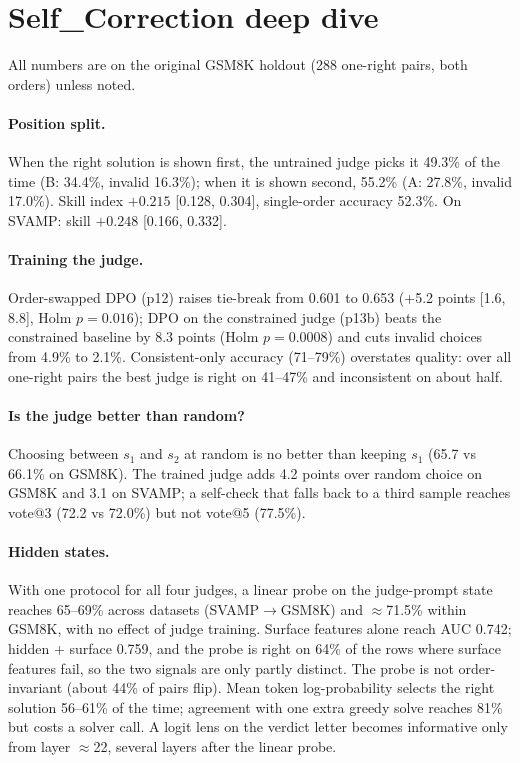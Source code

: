 \documentclass[11pt]{article}
\begin{document}
\section{Self\_Correction deep dive}\label{app:sc}
All numbers are on the original GSM8K holdout (288 one-right pairs, both orders) unless noted.
\paragraph{Position split.} When the right solution is shown first, the untrained judge picks it 49.3\% of the
time (B: 34.4\%, invalid 16.3\%); when it is shown second, 55.2\% (A: 27.8\%, invalid 17.0\%). Skill index
$+0.215$ [0.128, 0.304], single-order accuracy 52.3\%. On SVAMP: skill $+0.248$ [0.166, 0.332].
\paragraph{Training the judge.} Order-swapped DPO (p12) raises tie-break from 0.601 to 0.653 (+5.2 points
[1.6, 8.8], Holm $p=0.016$); DPO on the constrained judge (p13b) beats the constrained baseline by 8.3 points
(Holm $p=0.0008$) and cuts invalid choices from 4.9\% to 2.1\%. Consistent-only accuracy (71--79\%) overstates
quality: over all one-right pairs the best judge is right on 41--47\% and inconsistent on about half.
\paragraph{Is the judge better than random?} Choosing between $s_1$ and $s_2$ at random is no better than
keeping $s_1$ (65.7 vs 66.1\% on GSM8K). The trained judge adds 4.2 points over random choice on GSM8K and 3.1
on SVAMP; a self-check that falls back to a third sample reaches vote@3 (72.2 vs 72.0\%) but not vote@5 (77.5\%).
\paragraph{Hidden states.} With one protocol for all four judges, a linear probe on the judge-prompt state
reaches 65--69\% across datasets (SVAMP$\to$GSM8K) and $\approx$71.5\% within GSM8K, with no effect of judge
training. Surface features alone reach AUC 0.742; hidden + surface 0.759, and the probe is right on 64\% of
the rows where surface features fail, so the two signals are only partly distinct. The probe is not
order-invariant (about 44\% of pairs flip). Mean token log-probability selects the right solution 56--61\% of
the time; agreement with one extra greedy solve reaches 81\% but costs a solver call. A logit lens on the
verdict letter becomes informative only from layer $\approx$22, several layers after the linear probe.
\end{document}
